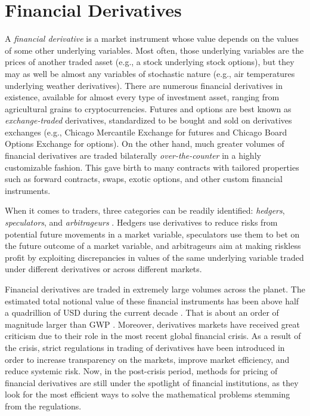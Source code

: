 \documentclass{UUThesisTemplate}
\begin{document}
\chapter{Financial Derivatives}
\label{ch:finder}
\par A \emph{financial derivative} is a market instrument whose value depends on the values of some other underlying variables. Most often, those underlying variables are the prices of another traded asset (e.g., a stock underlying stock options), but they may as well be almost any variables of stochastic nature (e.g., air temperatures underlying weather derivatives). There are numerous financial derivatives in existence, available for almost every type of investment asset, ranging from agricultural grains to cryptocurrencies. Futures and options are best known as \emph{exchange-traded} derivatives, standardized to be bought and sold on derivatives exchanges (e.g., Chicago Mercantile Exchange for futures and Chicago Board Options Exchange for options). On the other hand, much greater volumes of financial derivatives are traded bilaterally \emph{over-the-counter} in a highly customizable fashion. This gave birth to many contracts with tailored properties such as forward contracts, swaps, exotic options, and other custom financial instruments.
\par When it comes to traders, three categories can be readily identified: \emph{hedgers}, \emph{speculators}, and \emph{arbitrageurs} \cite{hull2017options}. Hedgers use derivatives to reduce risks from potential future movements in a market variable, speculators use them to bet on the future outcome of a market variable, and arbitrageurs aim at making riskless profit by exploiting discrepancies in values of the same underlying variable traded under different derivatives or across different markets.
\par Financial derivatives are traded in extremely large volumes across the planet. %
The estimated total notional value of these financial instruments has been above half a quadrillion of USD during the current decade \cite{bank2018annual}. That is about an order of magnitude larger than GWP \cite{worldgdp2018annual}. Moreover, derivatives markets have received great criticism due to their role in the most recent global financial crisis.  As a result of the crisis, strict regulations in trading of derivatives have been introduced in order to increase transparency on the markets, improve market efficiency, and reduce systemic risk. Now, in the post-crisis period, methods for pricing of financial derivatives are still under the spotlight of financial institutions, as they look for the most efficient ways to solve the mathematical problems stemming from the regulations.
\end{document}
